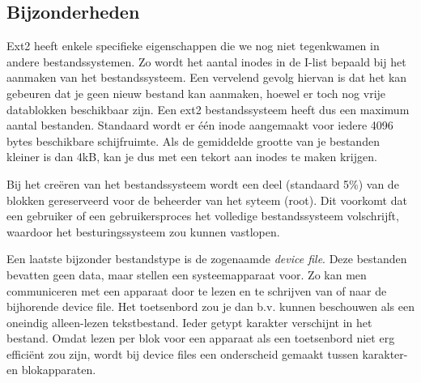 \subsection{Bijzonderheden}

Ext2 heeft enkele specifieke eigenschappen die we nog niet tegenkwamen in andere bestandssystemen. Zo wordt
het aantal inodes in de I-list bepaald bij het aanmaken van het bestandssysteem. Een vervelend
gevolg hiervan is dat het kan gebeuren dat je geen nieuw bestand kan aanmaken, hoewel er toch nog vrije
datablokken beschikbaar zijn. Een ext2 bestandssysteem heeft dus een maximum aantal bestanden. Standaard
wordt er \'e\'en inode aangemaakt voor iedere 4096 bytes beschikbare schijfruimte. Als de gemiddelde grootte
van je bestanden kleiner is dan 4kB, kan je dus met een tekort aan inodes te maken krijgen.

Bij het cre\"eren van het bestandssysteem wordt een deel (standaard 5\%) van de blokken gereserveerd voor
de beheerder van het syteem (root). Dit voorkomt dat een gebruiker of een gebruikersproces het volledige
bestandssysteem volschrijft, waardoor het besturingssysteem zou kunnen vastlopen.

Een laatste bijzonder bestandstype is de zogenaamde \emph{device file}. Deze bestanden bevatten geen data, maar
stellen een systeemapparaat voor. Zo kan men communiceren met een apparaat door te lezen en te schrijven van of
naar de bijhorende device file. Het toetsenbord zou je dan b.v. kunnen beschouwen als een oneindig alleen-lezen
tekstbestand. Ieder getypt karakter verschijnt in het bestand. Omdat lezen per blok voor een apparaat als een
toetsenbord niet erg effici\"ent zou zijn, wordt bij device files een onderscheid gemaakt tussen karakter- en
blokapparaten.
